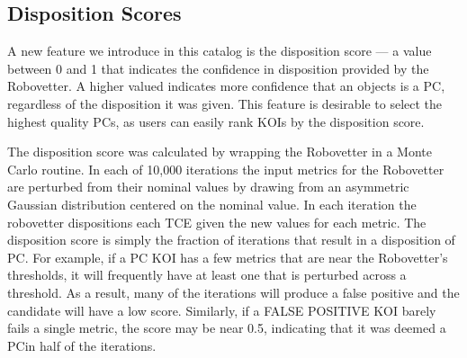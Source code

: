 

\subsection{Disposition Scores}
\label{s:scores}
A new feature we introduce in this catalog is the disposition score --- a value between 0 and 1 that indicates the confidence in disposition provided by the Robovetter. A higher valued indicates more confidence that an objects is a PC, regardless of the disposition it was given.  This feature is desirable to select the highest quality PCs, as users can easily rank KOIs by the disposition score. 

The disposition score was calculated by wrapping the Robovetter in a Monte Carlo routine. In each of 10,000 iterations the input metrics for the Robovetter are perturbed from their nominal values by drawing from an asymmetric Gaussian distribution centered on the nominal value. In each iteration the robovetter dispositions each TCE given the new values for each metric. The disposition score is simply the fraction of iterations that result in a disposition of PC. For example, if a PC KOI has a few metrics that are near the Robovetter's thresholds, it will frequently have at least one that is perturbed across a threshold. As a result, many of the iterations will produce a false positive and the candidate will have a low score.  Similarly, if a FALSE POSITIVE KOI barely fails a single metric, the score may be near 0.5, indicating that it was deemed a PCin half of the iterations.

